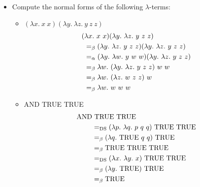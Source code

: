 \documentclass[11pt]{report}
\begin{document}
\begin{itemize}


	\item Compute the normal forms of the following $\lambda$-terms: 
	
	\begin{itemize}
		\item[] $(\lambda x. \ x \ x)(\lambda y. \ \lambda z. \ y \ z \ z)$
		\begin{align*}
			(&\lambda x. \ x \ x)(\lambda y. \ \lambda z. \ y \ z \ z) \\
			&\beq (\lambda y. \ \lambda z. \ y \ z \ z) (\lambda y. \ \lambda z. \ y \ z \ z) \\
			&\aeq (\lambda y. \ \lambda w. \ y \ w \ w)(\lambda y. \ \lambda z. \ y \ z \ z)\\
			&\beq \lambda w. \ (\lambda y. \ \lambda z. \ y \ z \ z) \ w \ w \\
			&\beq \lambda w. \ (\lambda z. \ w \ z \ z) \ w \\
			&\beq \lambda w. \ w \ w \ w			
		\end{align*}
		\item[] AND TRUE TRUE
		\begin{align*}
			\AND& \ \TRUE \ \TRUE \\
			&=_{\text{DS}} (\lambda p. \ \lambda q. \ p \ q \ q) \ \TRUE \ \TRUE \\
			&\beq (\lambda q. \ \TRUE \ q \ q) \ \TRUE \\
			&\beq \TRUE \ \TRUE \ \TRUE \\
			&=_{\text{DS}} (\lambda x. \ \lambda y. \ x) \ \TRUE \ \TRUE \\
			&\beq (\lambda y. \ \TRUE) \ \TRUE \\
			&\beq \TRUE
		\end{align*}

	
	\end{itemize}
	
\end{itemize}	
\end{document}
